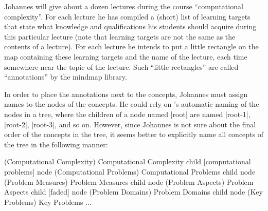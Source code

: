 Johannes will give about a dozen lectures during the course ``computational
complexity''. For each lecture he has compiled a (short) list of learning
targets that state what knowledge and qualifications his students should
acquire during this particular lecture (note that learning targets are not the
same as the contents of a lecture). For each lecture he intends to put a little
rectangle on the map containing these learning targets and the name of the
lecture, each time somewhere near the topic of the lecture. Such ``little
rectangles'' are called ``annotations'' by the mindmap library.

In order to place the annotations next to the concepts, Johannes must assign
names to the nodes of the concepts. He could rely on \tikzname's automatic
naming of the nodes in a tree, where the children of a node named |root| are
named |root-1|, |root-2|, |root-3|, and so on. However, since Johannes is not
sure about the final order of the concepts in the tree, it seems better to
explicitly name all concepts of the tree in the following manner:
%
\begin{codeexample}
 (Computational Complexity) {Computational Complexity}
  child [computational problems] { node (Computational Problems) {Computational Problems}
    child         { node (Problem Measures) {Problem Measures} }
    child         { node (Problem Aspects) {Problem Aspects} }
    child [faded] { node (Problem Domains) {Problem Domains} }
    child         { node (Key Problems) {Key Problems} }
  }
...
\end{codeexample}

